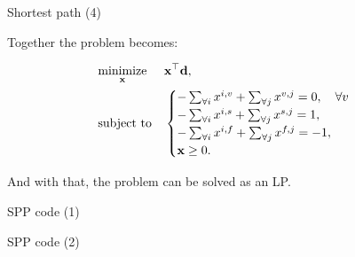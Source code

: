 \documentclass{beamer}
\begin{document}
\begin{frame}{Shortest path (4)}
	\begin{flushleft}
		
		
		Together the problem becomes:
		
		\begin{equation} \label{LP}
			\begin{aligned}
				& \underset{\mathbf{x}}{\text{minimize}}
				& & \mathbf{x}^\top \mathbf{d}, \\
				& \text{subject to}
				& & \begin{cases} 
					-\sum_{\forall i} x^{i,v} + \sum_{\forall j} x^{v,j} = 0, \ \ \ \forall v \\ 
					-\sum_{\forall i} x^{i,s} + \sum_{\forall j} x^{s,j} = 1,  \\
					-\sum_{\forall i} x^{i,f} + \sum_{\forall j} x^{f,j} = -1,\\
					\mathbf{x} \geq 0.
				\end{cases}
			\end{aligned}
		\end{equation}
	
		And with that, the problem can be solved as an LP.
		
	\end{flushleft}
\end{frame}



\begin{frame}{SPP code (1)}
	\begin{flushleft}
		
		
		
	\end{flushleft}
\end{frame}



\begin{frame}{SPP code (2)}
	\begin{flushleft}
		
		
		
	\end{flushleft}
\end{frame}
\end{document}
